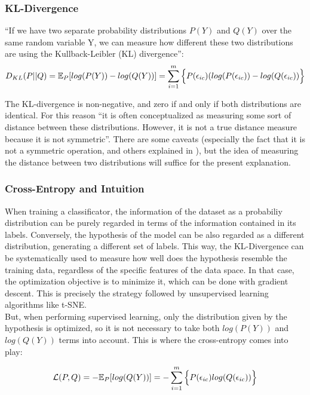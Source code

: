 \subsubsection{KL-Divergence}
``If we have two separate probability distributions \(P(Y)\) and \(Q(Y)\) over the same random variable Y, we can measure how different these two distributions are using the Kullback-Leibler (KL) divergence'':
\begin{equation*}
  D_{KL}(P || Q) = \mathbb{E}_P[log(P(Y))-log(Q(Y))] = \sum_{i=1}^{m} \Big\{P(\epsilon_{ic}) (log(P(\epsilon_{ic}))-log(Q(\epsilon_{ic})) \Big\}\\[3mm]
\end{equation*}

The KL-divergence is non-negative, and zero if and only if both distributions are identical. For this reason ``it is often conceptualized as measuring some sort of distance between these distributions. However, it is not a true distance measure because it is not symmetric''. There are some caveats (especially the fact that it is not a symmetric operation, and others explained in \cite[p.74]{goodfellow}), but the idea of measuring the distance between two distributions will suffice for the present explanation.

\subsubsection{Cross-Entropy and Intuition}
When training a classificator, the information of the dataset as a probabiliy distribution can be purely regarded in terms of the information contained in its labels. Conversely, the hypothesis of the model can be also regarded as a different distribution, generating a different set of labels. This way, the KL-Divergence can be systematically used to measure how well does the hypothesis resemble the training data, regardless of the specific features of the data space. In that case, the optimization objective is to minimize it, which can be done with gradient descent. This is precisely the strategy followed by unsupervised learning algorithms like t-SNE\cite{t-sne}.\\

But, when performing supervised learning, only the distribution given by the hypothesis is optimized, so it is not necessary to take both \(log(P(Y))\) and \(log(Q(Y))\) terms into account. This is where the cross-entropy comes into play:

\begin{equation*}
  \mathcal{L}(P, Q) = -\mathbb{E}_P[log(Q(Y))] = -\sum_{i=1}^{m} \Big\{P(\epsilon_{ic}) log(Q(\epsilon_{ic})) \Big\}\\[3mm]
\end{equation*}


